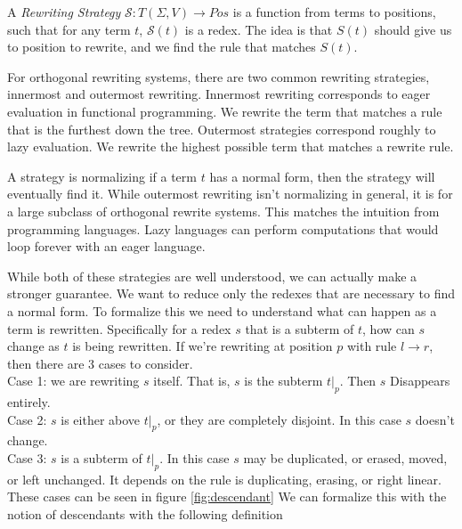 \documentclass{article}
\theoremstyle{definition}
\begin{document}
A \textit{Rewriting Strategy} $\mathcal{S} : T(\Sigma, V) \to Pos$ is a function from terms to positions,
such that for any term $t$, $\mathcal{S}(t)$ is a redex.
The idea is that $S(t)$ should give us to position to rewrite, and we find the rule that matches $S(t)$.

For orthogonal rewriting systems, there are two common rewriting strategies,
innermost and outermost rewriting.
Innermost rewriting corresponds to eager evaluation in functional programming.
We rewrite the term that matches a rule that is the furthest down the tree.
Outermost strategies correspond roughly to lazy evaluation.
We rewrite the highest possible term that matches a rewrite rule.

A strategy is normalizing if a term $t$ has a normal form, then the strategy will eventually find it.
While outermost rewriting isn't normalizing in general, it is for a large subclass of orthogonal rewrite systems.
This matches the intuition from programming languages.
Lazy languages can perform computations that would loop forever with an eager language.

While both of these strategies are well understood, we can actually make a stronger guarantee.
We want to reduce only the redexes that are necessary to find a normal form.
To formalize this we need to understand what can happen as a term is rewritten.
Specifically for a redex $s$ that is a subterm of $t$, how can $s$ change as $t$ is being rewritten.
If we're rewriting at position $p$ with rule $l \to r$, then there are 3 cases to consider.\\
Case 1: we are rewriting $s$ itself.  That is, $s$ is the subterm $t|_p$.
Then $s$ Disappears entirely.\\
Case 2: $s$ is either above $t|_p$, or they are completely disjoint.
In this case $s$ doesn't change.\\
Case 3: $s$ is a subterm of $t|_p$.
In this case $s$ may be duplicated, or erased, moved, or left unchanged.
It depends on the rule is duplicating, erasing, or right linear.\\
These cases can be seen in figure \ref{fig:descendant}
We can formalize this with the notion of descendants with the following definition
\end{document}
